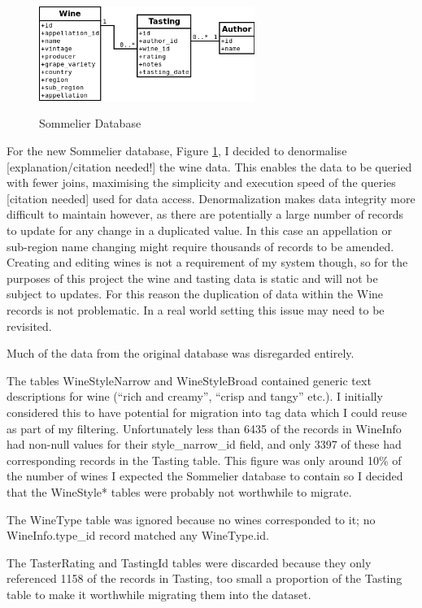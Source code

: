 
\begin{figure}[h!]
    \caption{Sommelier Database}
    \centering
        \includegraphics[width=7cm]{SommelierDBSimple}
    \label{fig:sommelierdb}
\end{figure}

For the new Sommelier database, Figure \ref{fig:sommelierdb}, I decided to denormalise [explanation/citation needed!] the wine data. This enables the data to be queried with fewer joins, maximising the simplicity and execution speed of the queries [citation needed] used for data access. Denormalization makes data integrity more difficult to maintain however, as there are potentially a large number of records to update for any change in a duplicated value. In this case an appellation or sub-region name changing might require thousands of records to be amended. Creating and editing wines is not a requirement of my system though, so for the purposes of this project the wine and tasting data is static and will not be subject to updates. For this reason the duplication of data within the Wine records is not problematic. In a real world setting this issue may need to be revisited.

Much of the data from the original database was disregarded entirely.

The tables WineStyleNarrow and WineStyleBroad contained generic text descriptions for wine (``rich and creamy'', ``crisp and tangy'' etc.). I initially considered this to have potential for migration into tag data which I could reuse as part of my filtering. Unfortunately less than 6435 of the records in WineInfo had non-null values for their style\_narrow\_id field, and only 3397 of these had corresponding records in the Tasting table. This figure was only around 10\% of the number of wines I expected the Sommelier database to contain so I decided that the WineStyle* tables were probably not worthwhile to migrate.

The WineType table was ignored because no wines corresponded to it; no WineInfo.type\_id record matched any WineType.id.

The TasterRating and TastingId tables were discarded because they only referenced 1158 of the records in Tasting, too small a proportion of the Tasting table to make it worthwhile migrating them into the dataset.

